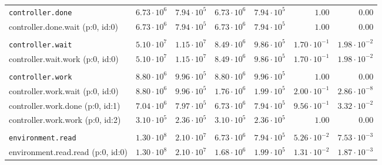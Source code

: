 \begin{table}[htbp]
{\begin{tabular}{lrrrrrr}
\\[-8pt]\texttt{controller.done}              & $6.73 \cdot 10^{6}$ & $7.94 \cdot 10^{5}$ & $6.73 \cdot 10^{6}$ & $7.94 \cdot 10^{5}$ &               $1.00$ &               $0.00$ \\
\hspace{3mm}controller.done.wait (p:0, id:0)  & $6.73 \cdot 10^{6}$ & $7.94 \cdot 10^{5}$ & $6.73 \cdot 10^{6}$ & $7.94 \cdot 10^{5}$ &               $1.00$ &               $0.00$ \\
\\[-8pt]\texttt{controller.wait}              & $5.10 \cdot 10^{7}$ & $1.15 \cdot 10^{7}$ & $8.49 \cdot 10^{6}$ & $9.86 \cdot 10^{5}$ & $1.70 \cdot 10^{-1}$ & $1.98 \cdot 10^{-2}$ \\
\hspace{3mm}controller.wait.work (p:0, id:0)  & $5.10 \cdot 10^{7}$ & $1.15 \cdot 10^{7}$ & $8.49 \cdot 10^{6}$ & $9.86 \cdot 10^{5}$ & $1.70 \cdot 10^{-1}$ & $1.98 \cdot 10^{-2}$ \\
\\[-8pt]\texttt{controller.work}              & $8.80 \cdot 10^{6}$ & $9.96 \cdot 10^{5}$ & $8.80 \cdot 10^{6}$ & $9.96 \cdot 10^{5}$ &               $1.00$ &               $0.00$ \\
\hspace{3mm}controller.work.wait (p:0, id:0)  & $8.80 \cdot 10^{6}$ & $9.96 \cdot 10^{5}$ & $1.76 \cdot 10^{6}$ & $1.99 \cdot 10^{5}$ & $2.00 \cdot 10^{-1}$ & $2.86 \cdot 10^{-8}$ \\
\hspace{3mm}controller.work.done (p:0, id:1)  & $7.04 \cdot 10^{6}$ & $7.97 \cdot 10^{5}$ & $6.73 \cdot 10^{6}$ & $7.94 \cdot 10^{5}$ & $9.56 \cdot 10^{-1}$ & $3.32 \cdot 10^{-2}$ \\
\hspace{3mm}controller.work.work (p:0, id:2)  & $3.10 \cdot 10^{5}$ & $2.36 \cdot 10^{5}$ & $3.10 \cdot 10^{5}$ & $2.36 \cdot 10^{5}$ &               $1.00$ &               $0.00$ \\
\\[-8pt]\texttt{environment.read}             & $1.30 \cdot 10^{8}$ & $2.10 \cdot 10^{7}$ & $6.73 \cdot 10^{6}$ & $7.94 \cdot 10^{5}$ & $5.26 \cdot 10^{-2}$ & $7.53 \cdot 10^{-3}$ \\
\hspace{3mm}environment.read.read (p:0, id:0) & $1.30 \cdot 10^{8}$ & $2.10 \cdot 10^{7}$ & $1.68 \cdot 10^{6}$ & $1.99 \cdot 10^{5}$ & $1.31 \cdot 10^{-2}$ & $1.87 \cdot 10^{-3}$ \\

\end{tabular}}
\end{table}
